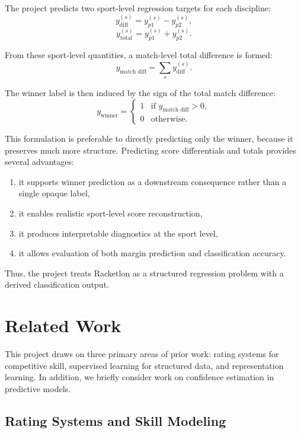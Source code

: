 \documentclass[10pt,twocolumn]{article}
\begin{document}
The project predicts two sport-level regression targets for each discipline:
\[
    y^{(s)}_{\text{diff}} = y^{(s)}_{p1} - y^{(s)}_{p2},
\]
\[
    y^{(s)}_{\text{total}} = y^{(s)}_{p1} + y^{(s)}_{p2}.
\]

From these sport-level quantities, a match-level total difference is formed:
\[
    y_{\text{match diff}} = \sum_s y^{(s)}_{\text{diff}}.
\]

The winner label is then induced by the sign of the total match difference:
\[
    y_{\text{winner}} =
    \begin{cases}
        1 & \text{if } y_{\text{match diff}} > 0, \\
        0 & \text{otherwise.}
    \end{cases}
\]

This formulation is preferable to directly predicting only the winner, because it preserves much more structure. Predicting score differentials and totals provides several advantages:
\begin{enumerate}[leftmargin=1.2em,itemsep=0.25em]
    \item it supports winner prediction as a downstream consequence rather than a single opaque label,
    \item it enables realistic sport-level score reconstruction,
    \item it produces interpretable diagnostics at the sport level,
    \item it allows evaluation of both margin prediction and classification accuracy.
\end{enumerate}

Thus, the project treats Racketlon as a structured regression problem with a derived classification output.

\section{Related Work}

This project draws on three primary areas of prior work: rating systems for competitive skill, supervised learning for structured data, and representation learning. In addition, we briefly consider work on confidence estimation in predictive models.

\subsection{Rating Systems and Skill Modeling}
\end{document}
